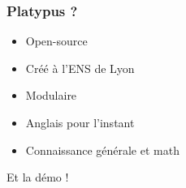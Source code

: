 \begin{frame}
    \frametitle{Platypus ?}
    \begin{itemize}
        \item<1-> \alert{Open-source}
        \item<2-> Créé à l'\alert{ENS de Lyon}
        \item<2-> \alert{Modulaire}
        \item<3-> \alert{Anglais} pour l'instant
        \item<4-> \alert{Connaissance générale} et math
    \end{itemize}
\end{frame}

\begin{frame}
    \begin{center}
        \Huge Et la démo !
    \end{center}
\end{frame}
